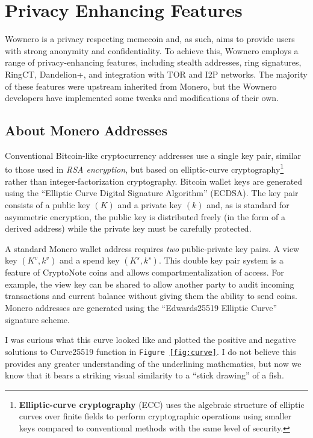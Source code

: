 \section{Privacy Enhancing Features}
Wownero is a privacy respecting memecoin\cite{wowbsite} and, as such, aims to provide users with strong anonymity and confidentiality. To achieve this, Wownero employs a range of privacy-enhancing features, including stealth addresses, ring signatures, RingCT, Dandelion+, and integration with TOR and I2P networks. The majority of these features were upstream inherited from Monero\cite{wowrepo,monero_repo}, but the Wownero developers have implemented some tweaks and modifications of their own.

\subsection{About Monero Addresses}
Conventional Bitcoin-like cryptocurrency addresses use a single key pair, similar to those used in \emph{RSA encryption}, but based on elliptic-curve cryptography\footnote{\textbf{Elliptic-curve cryptography} (ECC) uses the algebraic structure of elliptic curves over finite fields to perform cryptographic operations using smaller keys compared to conventional methods with the same level of security.}
\cite{zero2monero} rather than integer-factorization cryptography. Bitcoin wallet keys are generated using the ``Elliptic Curve Digital Signature Algorithm'' (ECDSA)\cite{ECDSA}. The key pair consists of a public key $(K)$ and a private key $(k)$ and, as is standard for asymmetric encryption, the public key is distributed freely (in the form of a derived address) while the private key must be carefully protected.

A standard Monero wallet address requires \emph{two} public-private key pairs. A view key $(K^v, k^v)$ and a spend key $(K^s, k^s)$\cite{monerodocs_addresses}. This double key pair system is a feature of CryptoNote coins and allows compartmentalization of access. For example, the view key can be shared to allow another party to audit incoming transactions and current balance without giving them the ability to send coins\cite{moneropedia}. Monero addresses are generated using the ``Edwards25519 Elliptic Curve'' signature scheme\cite{edwards_curve}.

I was curious what this curve looked like and plotted the positive and negative solutions to Curve25519 function in \texttt{Figure \ref{fig:curve}}. I do not believe this provides any greater understanding of the underlining mathematics, but now we know that it bears a striking visual similarity to a ``stick drawing'' of a fish.

